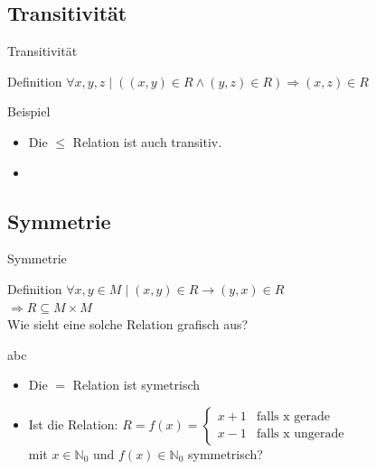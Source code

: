 	\subsection{Transitivität}
	\begin{frame}{Transitivität}
		\begin{block}{Definition}
			$\forall x,y,z \;|\; ((x,y) \in R \land (y,z) \in R) \Rightarrow (x,z) \in R$\\
		\end{block}
		
		\begin{exampleblock}{Beispiel}
			\begin{itemize}
				\item Die $\leq$ Relation ist auch transitiv.
				
				\pause
				\item 
			\end{itemize}
		\end{exampleblock}
	\end{frame}
	
	
	\subsection{Symmetrie}
	\begin{frame}{Symmetrie}
		\begin{block}{Definition}
			$\forall x, y \in M \; | \; (x,y) \in R \rightarrow (y,x) \in R$\\
			$\Rightarrow R \subseteq M \times M$\\
			\pause
			\vspace{10pt}
			Wie sieht eine solche Relation grafisch aus?
		\end{block}
		
		\begin{exampleblock}{abc}
			\begin{itemize}
				\item Die $=$ Relation ist symetrisch\\
				
				\pause
				\item Ist die Relation: 
					$
					R = f(x) =
					\begin{cases}
					x + 1 & \text{falls x gerade}\\
					x - 1 & \text{falls x ungerade}
					\end{cases}
					$
					\\ mit $x\in \mathbb{N}_0$ und $f(x) \in \mathbb{N}_0$ symmetrisch?
			\end{itemize}
		\end{exampleblock}
	\end{frame}
	
